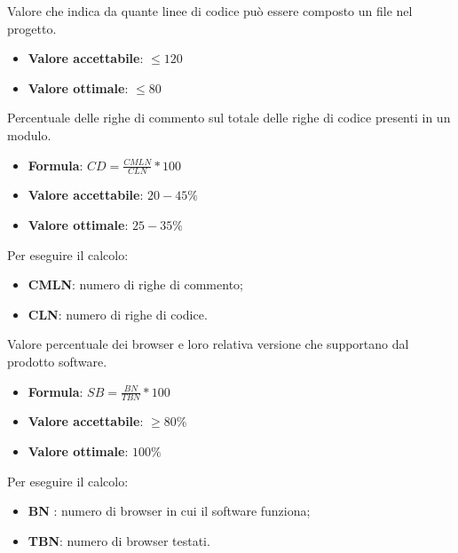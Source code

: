 Valore che indica da quante linee di codice può essere composto un file nel progetto.
\begin{itemize}
    \item \textbf{Valore accettabile}: $\leq120$
    \item \textbf{Valore ottimale}: $\leq80$
\end{itemize} 

Percentuale delle righe di commento sul totale delle righe di codice presenti in un modulo.
\begin{itemize}
    \item \textbf{Formula}: $CD=\frac{CMLN}{CLN}*100$
    \item \textbf{Valore accettabile}: $20-45\%$
    \item \textbf{Valore ottimale}: $25-35\%$
\end{itemize}  
Per eseguire il calcolo:
\begin{itemize}
    \item \textbf{CMLN}: numero di righe di commento;
    \item \textbf{CLN}: numero di righe di codice.
\end{itemize}

Valore percentuale dei browser e loro relativa versione che supportano dal prodotto software.
\begin{itemize}
    \item \textbf{Formula}: $SB=\frac{BN}{TBN}*100$
    \item \textbf{Valore accettabile}: $\geq80\%$
    \item \textbf{Valore ottimale}: $100\%$
\end{itemize}  
Per eseguire il calcolo:
\begin{itemize}
    \item \textbf{BN} : numero di browser in cui il software funziona;
    \item \textbf{TBN}: numero di browser testati.
\end{itemize}


